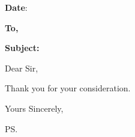 \documentclass[a4paper,12pt]{letter}
\date{}
\begin{document}
\begin{letter}{}
   \textbf{Date}: \underline{}
\begin{flushleft}
\textbf{To,}\\
\leftskip=0.5cm
\leftskip=0cm
\end{flushleft}

\begin{center}
	\textbf{Subject:}  \underline{}
\end{center}

\vspace{-1cm}
\opening{Dear Sir,}

Thank you for your consideration.
\closing{ Yours Sincerely,\\
	}
\ps{}
\vfill
\end{letter}
\end{document}
